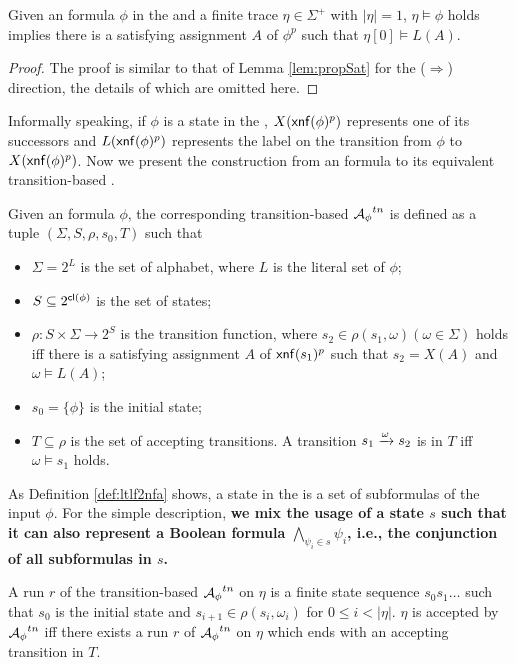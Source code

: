 \begin{corollary}\label{coro:propSat}
Given an \ltlf formula $\phi$ in the \XNF and a finite trace $\eta\in\Sigma^+$ with $|\eta|=1$, $\eta\models\phi$ holds implies there is a satisfying assignment $A$ of $\phi^p$ such that $\eta[0]\models L(A)$.
\end{corollary}
\begin{proof}
The proof is similar to that of Lemma \ref{lem:propSat} for the ($\Rightarrow$) direction, the details of which are omitted here.
\end{proof}
  
Informally speaking, if $\phi$ is a state in the \NFA, $X({\sf xnf}(\phi)^p)$ represents one of its successors and $L({\sf xnf}(\phi)^p)$ represents the label on the transition from $\phi$ to $X({\sf xnf}(\phi)^p)$. Now we present the construction from an \ltlf formula to its equivalent transition-based \NFA. 

   
\begin{definition}\label{def:ltlf2nfa} 
Given an \ltlf formula $\phi$, the corresponding transition-based \NFA ${\mathcal{A}_{\phi}}^{tn}$ is defined as a tuple $(\Sigma, S, \rho, s_0, T)$ such that
\begin{itemize}
	\item $\Sigma = 2^{L}$ is the set of alphabet, where $L$ is the literal set of $\phi$;
	\item $S\subseteq 2^{{\sf cl}(\phi)}$ is the set of states;
	\item $\rho:  S \times \Sigma \to 2^S$ is the transition function, where $s_2 \in \rho(s_1, \omega) (\omega \in \Sigma)$ holds iff there is a satisfying assignment $A$ of ${\sf xnf}(s_1)^p$ such that $s_2 = X(A)$ and $\omega\models L(A)$;
	\item $s_0 = \{\phi \}$ is the initial state;
	\item $T\subseteq \rho$ is the set of accepting transitions. A transition $s_1\xrightarrow[]{\omega}s_2$ is in $T$ iff $\omega\models s_1$ holds. 
\end{itemize}
\end{definition}

As Definition \ref{def:ltlf2nfa} shows, a state in the \NFA is a set of subformulas of the input $\phi$. For the simple description, \textbf{we mix the usage of a state $s$ such that it can also represent a Boolean formula $\bigwedge_{\psi_i\in s}\psi_i$, i.e., the conjunction of all subformulas in $s$.} 

A run $r$ of the transition-based \NFA ${\mathcal{A}_{\phi}}^{tn}$ on $\eta$ is a finite state sequence $s_0 s_1\ldots$ such that $s_0$ is the initial state and $s_{i+1}\in\rho(s_i,\omega_i)$ for $0\leq i < |\eta|$. $\eta$ is accepted by ${\mathcal{A}_{\phi}}^{tn}$ iff there exists a run $r$ of ${\mathcal{A}_{\phi}}^{tn}$ on $\eta$ which ends with an accepting transition in $T$. 

